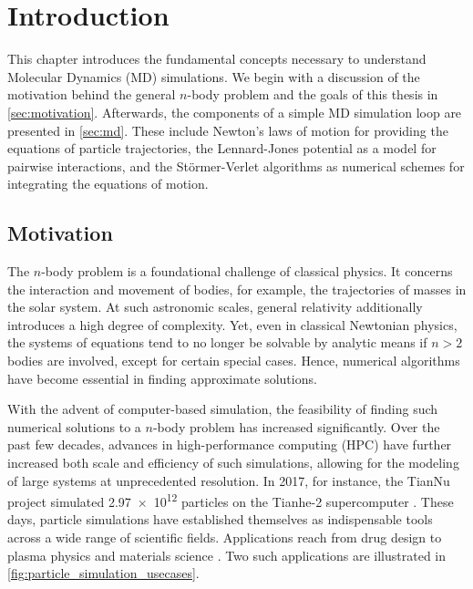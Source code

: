 \chapter[Introduction]{Introduction}
\label{cp:introduction}

{
	\parindent0pt
	This chapter introduces the fundamental concepts necessary to understand Molecular Dynamics (MD) simulations. We begin with a discussion of the motivation behind the general $n$-body problem and the goals of this thesis in \autoref{sec:motivation}.
	Afterwards, the components of a simple MD simulation loop are presented in \autoref{sec:md}. These include Newton’s laws of motion for providing the equations of particle trajectories, the Lennard-Jones potential as a model for pairwise interactions, and the Störmer-Verlet algorithms as numerical schemes for integrating the equations of motion.
}


\section{Motivation}
\label{sec:motivation}

The $n$-body problem is a foundational challenge of classical physics. It  concerns the interaction and movement of bodies, for example, the trajectories of masses in the solar system. At such astronomic scales, general relativity additionally introduces a high degree of complexity. Yet, even in classical Newtonian physics, the systems of equations tend to no longer be solvable by analytic means if $n>2$ bodies are involved, except for certain special cases. Hence, numerical algorithms have become essential in finding approximate solutions. \cite{Arnold1985}

With the advent of computer-based simulation, the feasibility of finding such numerical solutions to a $n$-body problem has increased significantly.
Over the past few decades, advances in high-performance computing (HPC) have further increased both scale and efficiency of such simulations, allowing for the modeling of large systems at unprecedented resolution. In 2017, for instance, the TianNu project simulated \num{2.97e12} particles on the Tianhe-2 supercomputer \cite{Emberson2017}.
These days, particle simulations have established themselves as indispensable tools across a wide range of scientific fields. Applications reach from drug design \cite{Hollingsworth2018} to plasma physics \cite{Verboncoeur2005} and materials science \cite{Parteli2016}. Two such applications are illustrated in \autoref{fig:particle_simulation_usecases}.

